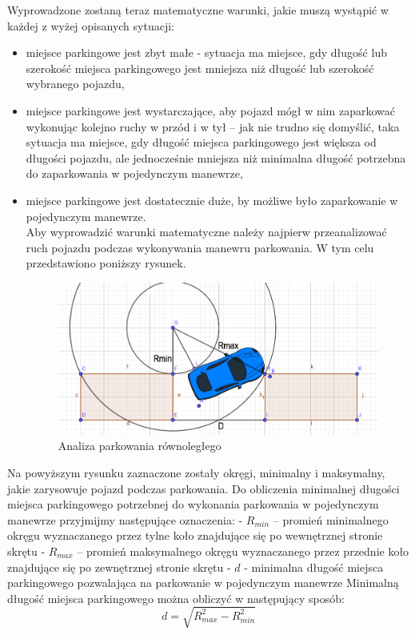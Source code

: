 \documentclass[a4paper,11pt,twoside]{report}
\theoremstyle{definition}
\begin{document}
Wyprowadzone zostaną teraz matematyczne warunki, jakie muszą wystąpić w każdej z wyżej opisanych sytuacji:
\begin{itemize}
	\item miejsce parkingowe jest zbyt małe - sytuacja ma miejsce, gdy długość lub szerokość miejsca parkingowego jest mniejsza niż długość lub szerokość wybranego pojazdu,
	\item miejsce parkingowe jest wystarczające, aby pojazd mógł w nim zaparkować wykonując kolejno ruchy w przód i w tył – jak nie trudno się domyślić, taka sytuacja ma miejsce, gdy długość miejsca parkingowego jest większa od długości pojazdu, ale jednocześnie mniejsza niż minimalna długość potrzebna do zaparkowania w pojedynczym manewrze,
	\item miejsce parkingowe jest dostatecznie duże, by możliwe było zaparkowanie w pojedynczym manewrze. 
	~\\Aby wyprowadzić warunki matematyczne należy najpierw przeanalizować ruch pojazdu podczas wykonywania manewru parkowania. W tym celu przedstawiono poniższy rysunek.
	
\begin{figure}[h!]
\centering
\includegraphics[scale=0.4]{vehicleParallelParkingAnalysis}
\caption[Analiza parkowania równoległego]{Analiza parkowania równoległego}
\end{figure}
	
\end{itemize}

Na powyższym rysunku zaznaczone zostały okręgi, minimalny i maksymalny, jakie zarysowuje pojazd podczas parkowania. Do obliczenia minimalnej długości miejsca parkingowego potrzebnej do wykonania parkowania w pojedynczym manewrze przyjmijmy następujące oznaczenia:
- $R_{min}$ – promień minimalnego okręgu wyznaczanego przez tylne koło znajdujące się po wewnętrznej stronie skrętu
- $R_{max}$ – promień maksymalnego okręgu wyznaczanego przez przednie koło znajdujące się po zewnętrznej stronie skrętu
- $d$ - minimalna długość miejsca parkingowego pozwalająca na parkowanie w pojedynczym manewrze
Minimalną długość miejsca parkingowego można obliczyć w następujący sposób:
$$
d = \sqrt{R^{2}_{max} - R^{2}_{min}}
$$
\end{document}
